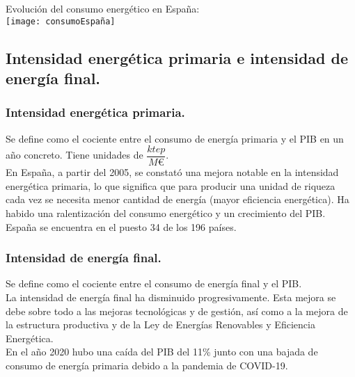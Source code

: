 			Evolución del consumo energético en España:\\
			\texttt{[image: consumoEspaña]}
		
		\subsection{Intensidad energética primaria e intensidad de energía final.}
			\subsubsection{Intensidad energética primaria.}
				Se define como el cociente entre el consumo de energía primaria y el PIB en un año concreto. Tiene unidades de $\dfrac{\textit{ktep}}{\textit{M€}}$.\\
				\indent En España, a partir del 2005, se constató una mejora notable en la
				intensidad energética primaria, lo que significa que para producir una
				unidad de riqueza cada vez se necesita menor cantidad de energía (mayor
				eficiencia energética). Ha habido una ralentización del consumo energético y un
				crecimiento del PIB. España se encuentra en el puesto 34 de los 196 países.
				
			\subsubsection{Intensidad de energía final.}
				Se define como el cociente entre el consumo de energía final y el PIB.\\
				\indent La intensidad de energía final ha disminuido progresivamente. Esta mejora se debe sobre todo
				a las mejoras tecnológicas y de gestión, así como a la mejora de la estructura productiva y de la Ley de Energías Renovables y Eficiencia Energética.\\
				\indent En el año 2020 hubo una caída del PIB del 11\% junto con una bajada de consumo de energía primaria debido a la pandemia de COVID-19.
		
		
		